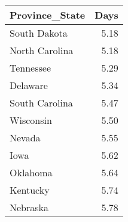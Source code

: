 \begin{tabular}{lr}
\toprule
 Province\_State &  Days \\
\midrule
   South Dakota &  5.18 \\
 North Carolina &  5.18 \\
      Tennessee &  5.29 \\
       Delaware &  5.34 \\
 South Carolina &  5.47 \\
      Wisconsin &  5.50 \\
         Nevada &  5.55 \\
           Iowa &  5.62 \\
       Oklahoma &  5.64 \\
       Kentucky &  5.74 \\
       Nebraska &  5.78 \\
\bottomrule
\end{tabular}
